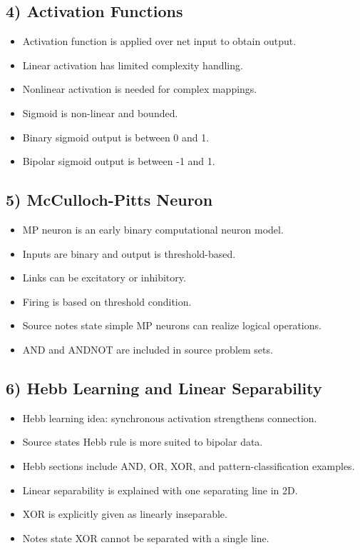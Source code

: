 \documentclass[11pt,a4paper]{article}
\begin{document}
\subsection*{4) Activation Functions}
\begin{itemize}
\item Activation function is applied over net input to obtain output.
\item Linear activation has limited complexity handling.
\item Nonlinear activation is needed for complex mappings.
\item Sigmoid is non-linear and bounded.
\item Binary sigmoid output is between 0 and 1.
\item Bipolar sigmoid output is between -1 and 1.
\end{itemize}

\subsection*{5) McCulloch-Pitts Neuron}
\begin{itemize}
\item MP neuron is an early binary computational neuron model.
\item Inputs are binary and output is threshold-based.
\item Links can be excitatory or inhibitory.
\item Firing is based on threshold condition.
\item Source notes state simple MP neurons can realize logical operations.
\item AND and ANDNOT are included in source problem sets.
\end{itemize}

\subsection*{6) Hebb Learning and Linear Separability}
\begin{itemize}
\item Hebb learning idea: synchronous activation strengthens connection.
\item Source states Hebb rule is more suited to bipolar data.
\item Hebb sections include AND, OR, XOR, and pattern-classification examples.
\item Linear separability is explained with one separating line in 2D.
\item XOR is explicitly given as linearly inseparable.
\item Notes state XOR cannot be separated with a single line.
\end{itemize}
\end{document}
